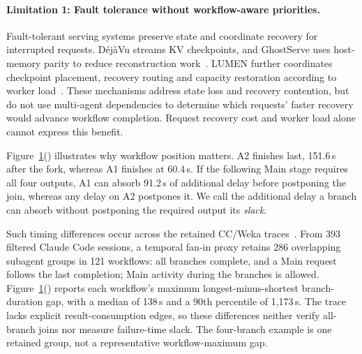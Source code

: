 \begin{figure}[t]
  \label{fig:motivation}
\end{figure}

\paragraph{Limitation 1: Fault tolerance without workflow-aware priorities.}
Fault-tolerant serving systems preserve state and coordinate recovery
for interrupted requests. D\'ej\`aVu streams KV checkpoints, and GhostServe
uses host-memory parity to reduce reconstruction
work~\cite{strati2024dejavu,jayakody2026ghostserve}.
LUMEN further coordinates checkpoint placement, recovery routing and
capacity restoration according to worker load~\cite{cao2026lumen}.
These mechanisms address state loss and recovery contention, but do not
use multi-agent dependencies to determine which requests' faster
recovery would advance workflow completion. Request recovery cost and
worker load alone cannot express this benefit.

\label{sec:motivation-workflow}
Figure~\ref{fig:motivation}() illustrates
why workflow position matters. A2 finishes last, 151.6\,s after the fork,
whereas A1 finishes at 60.4\,s. If the following Main stage requires all
four outputs, A1 can absorb 91.2\,s of additional delay before postponing
the join, whereas any delay on A2 postpones it. We call the additional
delay a branch can absorb without postponing the required output its
\emph{slack}.

Such timing differences occur across the retained CC/Weka
traces~\cite{semianalysis2026cctraces}. From 393 filtered Claude Code
sessions, a temporal fan-in proxy retains 286 overlapping subagent
groups in 121 workflows: all branches complete, and a Main request
follows the last completion; Main activity during the branches is allowed.
Figure~\ref{fig:motivation}() reports
each workflow's maximum longest-minus-shortest branch-duration gap,
with a median of 138\,s and a 90th percentile of 1,173\,s.
The trace lacks explicit result-consumption edges, so these differences
neither verify all-branch joins nor measure failure-time slack.
The four-branch example is one retained group, not a representative
workflow-maximum gap.

